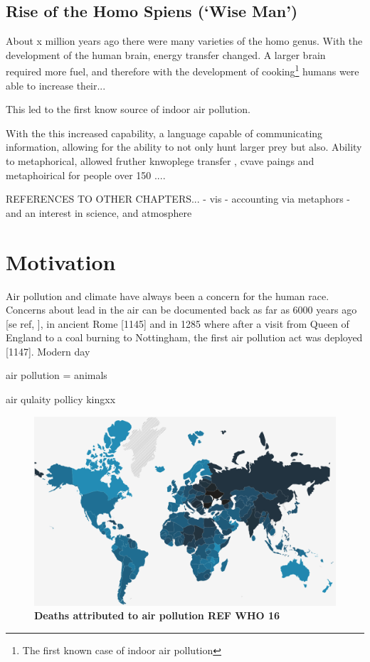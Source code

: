 \subsection{Rise of the Homo Spiens (`Wise Man')}
About x million years ago there were many varieties of the homo genus. With the development of the human brain, energy transfer changed. A larger brain required more fuel, and therefore with the development of cooking\footnote{The first known case of indoor air pollution} humans were able to increase their... 

This led to the first know source of indoor air pollution. 


With the this increased capability, a language capable of communicating information, allowing for the ability to not only hunt larger prey but also. 
Ability to metaphorical, allowed fruther knwoplege transfer , cvave paings and metaphoirical for people over 150 .... 

REFERENCES TO OTHER CHAPTERS... 
- vis 
- accounting via metaphors
- and an interest in science, and atmosphere 

\section{Motivation}

Air pollution and climate have always been a concern for the human race. Concerns about lead in the air can be documented back as far as 6000 years ago [se ref, ], in ancient Rome [1145] and in 1285 where after a visit from Queen of England to a coal burning to Nottingham, the first air pollution act was deployed [1147]. Modern day




air pollution = animals

air qulaity pollicy
kingxx

\begin{figure}[H]
  \centering
  \includegraphics[width=\textwidth]{who.png}
  \caption{\textbf{Deaths attributed to air pollution REF WHO 16}}
  \label{fig:who}
\end{figure}




